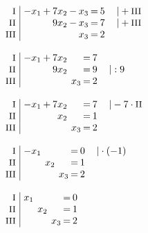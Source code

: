 \begin{equation*}
\begin{array}{l}
\setlength{\arraycolsep}{1pt}
\begin{array}{r|rcrcrcrl}
    \text{\small I } &\; -x_{1} & + & 7x_{2} & - & x_{3} & = & 5 & \quad|+\text{\small III} \\
   \text{\small II } &\;        &   & 9x_{2} & - & x_{3} & = & 7 & \quad|+\text{\small III} \\
  \text{\small III } &\;        &   &        &   & x_{3} & = & 2 &                            
\end{array}
\\ \\
\setlength{\arraycolsep}{1pt}
\begin{array}{r|rcrcrcrl}
    \text{\small I } &\; -x_{1} & + & 7x_{2} &  &       & = & 7 &          \\
   \text{\small II } &\;        &   & 9x_{2} &  &       & = & 9 & \quad|:9 \\
  \text{\small III } &\;        &   &        &  & x_{3} & = & 2 &            
\end{array}
\\ \\
\setlength{\arraycolsep}{1pt}
\begin{array}{r|rcrcrcrl}
    \text{\small I } &\; -x_{1} & + & 7x_{2} &  &       & = & 7 & \quad|-7\cdot\text{\small II} \\
   \text{\small II } &\;        &   &  x_{2} &  &       & = & 1 &                               \\
  \text{\small III } &\;        &   &        &  & x_{3} & = & 2 &                                 
\end{array}
\\ \\
\setlength{\arraycolsep}{1pt}
\begin{array}{r|rcrcrcrl}
    \text{\small I } &\; -x_{1} &  &       &  &       & = & 0 & \quad|\cdot(-1) \\
   \text{\small II } &\;        &  & x_{2} &  &       & = & 1 &                 \\
  \text{\small III } &\;        &  &       &  & x_{3} & = & 2 &                   
\end{array}
\\ \\
\setlength{\arraycolsep}{1pt}
\begin{array}{r|rcrcrcrl}
    \text{\small I } &\; x_{1} &  &       &  &       & = & 0 & \\
   \text{\small II } &\;       &  & x_{2} &  &       & = & 1 & \\
  \text{\small III } &\;       &  &       &  & x_{3} & = & 2 &   
\end{array}
\end{array}
\end{equation*}

